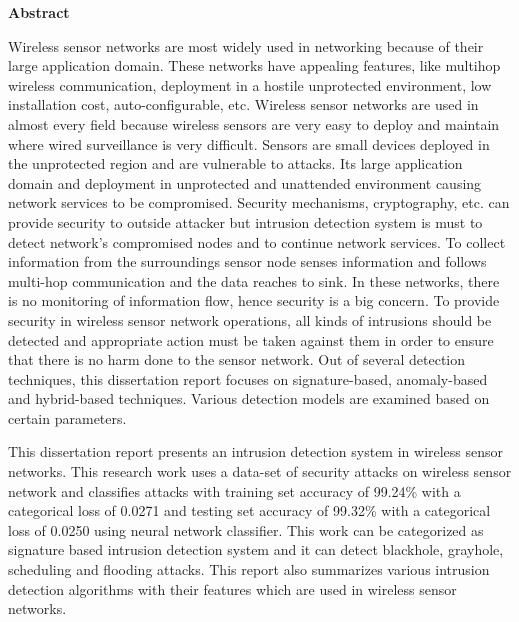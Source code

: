\vspace{4.0\baselineskip}
\textbf{\hspace{4.cm}
		\LARGE \textbf{Abstract}}

\vspace{15mm}
	 	 	
Wireless sensor networks are most widely used in networking because of their large application domain. These networks have appealing features, like multihop wireless communication, deployment in a hostile unprotected environment, low installation cost, auto-configurable, etc. Wireless sensor networks are used in almost every field because wireless sensors are very easy to deploy and maintain where wired surveillance is very difficult. Sensors are small devices deployed in the unprotected region and are vulnerable to attacks. Its large application domain and deployment in unprotected and unattended environment causing network services to be compromised. Security mechanisms, cryptography, etc. can provide security to outside attacker but intrusion detection system is must to detect network’s compromised nodes and to continue network services. To collect information from the surroundings sensor node senses information and follows multi-hop communication and the data reaches to sink. In these networks, there is no monitoring of information flow, hence security is a big concern. To provide security in wireless sensor network operations, all kinds of intrusions should be detected and appropriate action must be taken against them in order to ensure that there is no harm done to the sensor network. Out of several detection techniques, this dissertation report focuses on signature-based, anomaly-based and hybrid-based techniques. Various detection models are examined based on certain parameters.
\par
This dissertation report presents an intrusion detection system in wireless sensor networks. This research work uses a data-set of security attacks on wireless sensor network and classifies attacks with training set accuracy of 99.24\% with a categorical loss of 0.0271 and testing set accuracy of 99.32\% with a categorical loss of 0.0250 using neural network classifier. This work can be categorized as signature based intrusion detection system and it can detect blackhole, grayhole, scheduling and flooding attacks. This report also summarizes various intrusion detection algorithms with their features which are used in wireless sensor networks.
